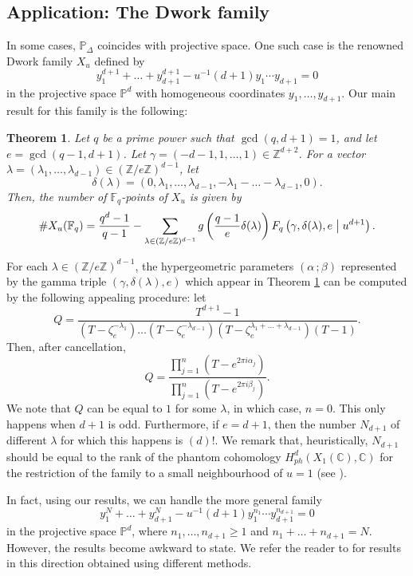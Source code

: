 \documentclass[11pt, reqno]{amsart}
\theoremstyle{plain}
\newtheorem{theo}{Theorem}[section]
\theoremstyle{definition}
\newcommand{\Z}{\mathbb{Z}}
\newcommand{\Ps}{\mathbb{P}}
\newcommand{\F}{\mathbb{F}}
\newcommand{\C}{\mathbb{C}}
\newcommand{\ga}{\gamma}
\newcommand{\be}{\beta}
\newcommand{\al}{\alpha}
\begin{document}
\subsection*{Application: The Dwork family}
In some cases, $\Ps_{\Delta}$ coincides with projective space. One such case is the renowned Dwork family $X_u$ defined by
\[
y_1^{d+1}+\dots + y_{d+1}^{d+1} - u^{-1} (d+1) y_1 \cdots y_{d+1} = 0
\]
in the projective space $\Ps^d$ with homogeneous coordinates $y_1, \dots, y_{d+1}$.
Our main result for this family is the following:
\begin{theo}\label{theo:Dwork}
Let $q$ be a prime power such that $\gcd(q,d+1)=1$, and let $e =\gcd(q-1,d+1)$. 
Let $\gamma= (-d-1,1,\dots,1) \in \Z^{d+2}$.
For a vector $\lambda =(\lambda_1,\dots,\lambda_{d-1}) \in (\Z/e\Z)^{d-1}$, let 
\[
\delta(\lambda) = (0,\lambda_1,\dots,\lambda_{d-1},-\lambda_1-\dots -\lambda_{d-1},0).
\]
Then, the number of $\F_q$-points of $X_u$ is given by
\[
\#X_u(\F_q) = \frac{q^{d}-1}{q-1} - \sum_{\lambda \in (\Z/e\Z)^{d-1}} g\left(\frac{q-1}{e}\delta(\lambda) \right) F_q\left(\gamma,\delta(\lambda), e \bigm\vert u^{d+1}\right).
\]   
\end{theo}
For each $\lambda \in \left(\Z/e\Z\right)^{d-1}$, the hypergeometric parameters $(\al \,;\be)$ represented by the gamma triple $(\ga,\delta(\lambda),e)$ which appear in Theorem \ref{theo:Dwork} can be computed by the following appealing procedure: let 
\begin{equation}\label{intro-Q-quotient}
Q= \frac{T^{d+1}-1}{(T- \zeta_{e}^{-\lambda_1}) \dots (T- \zeta_{e}^{-\lambda_{d-1}}) (T- \zeta_{e}^{\lambda_1+\dots +\lambda_{d-1}}) (T-1)}.
\end{equation}
Then, after cancellation, 
\[
Q = \frac{\prod_{j=1}^{n} \left(T- e^{2\pi i \al_j}\right) }{\prod_{j=1}^{n} \left(T- e^{2\pi i \be_j} \right)}.
\]
We note that $Q$ can be equal to $1$ for some $\lambda$, in which case, $n=0.$ 
This only happens when $d+1$ is odd. Furthermore, if $e=d+1$, then the number $ N_{d+1}$ of different $\lambda$ for which this happens is $(d)!$. We remark that, heuristically, $N_{d+1}$ should be equal to the rank of the phantom cohomology $H^{d}_{ph}(X_1(\C),\C)$  for the restriction of the family to a small neighbourhood of $u=1$ (see \cite[Equation (0.2)]{matt-kerr}).

In fact, using our results, we can handle the more general family 
\[
 y_1^{N}+\dots + y_{d+1}^{N} - u^{-1} (d+1) y_1^{n_1} \cdots y_{d+1}^{n_{d+1}} = 0
\]
in the projective space $\Ps^{d}$, where $n_1,\dots,n_{d+1} \ge 1$ and $n_1+\dots + n_{d+1}=N$. 
However, the results become awkward to state. We refer the reader to \cite{Dermot-Mccarthy} for results in this direction obtained using different methods. 
\end{document}

